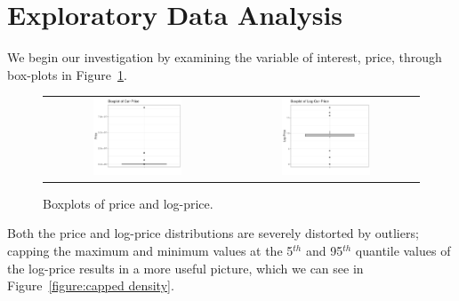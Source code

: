 \documentclass[a4paper, 10pt, titlepage]{article}
\begin{document}
\section{Exploratory Data Analysis}
We begin our investigation by examining the variable of interest, price, through box-plots in Figure~\ref{figure:uncapped boxplot}.

\begin{figure}[!ht]
	\centering
	   \begin{tabular}{cc}
	      \includegraphics[width = 0.5\textwidth]{price.png}  & \includegraphics[width = 0.5\textwidth]{logprice.png} 
	   \end{tabular}
	\caption{Boxplots of price and log-price.}
	\label{figure:uncapped boxplot}
\end{figure}

Both the price and log-price distributions are severely distorted by outliers; capping the maximum and minimum values at the 5$^{th}$ and 95$^{th}$ quantile values of the log-price results in a more useful picture, which we can see in Figure~\ref{figure:capped density}.
\end{document}
